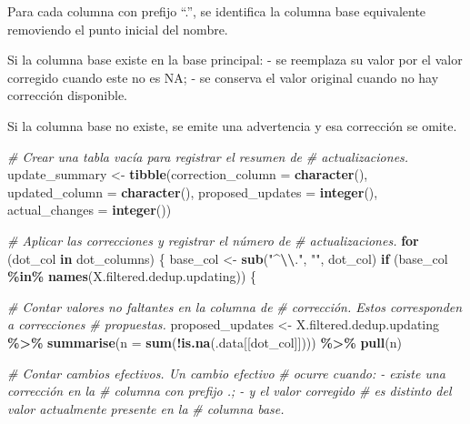 \documentclass[sn-apa,pdflatex]{sn-jnl}
\newenvironment{Shaded}{\begin{snugshade}}{\end{snugshade}}
\newcommand{\AttributeTok}[1]{\textcolor[rgb]{0.13,0.29,0.53}{#1}}
\newcommand{\CommentTok}[1]{\textcolor[rgb]{0.56,0.35,0.01}{\textit{#1}}}
\newcommand{\ControlFlowTok}[1]{\textcolor[rgb]{0.13,0.29,0.53}{\textbf{#1}}}
\newcommand{\FunctionTok}[1]{\textcolor[rgb]{0.13,0.29,0.53}{\textbf{#1}}}
\newcommand{\NormalTok}[1]{#1}
\newcommand{\OtherTok}[1]{\textcolor[rgb]{0.56,0.35,0.01}{#1}}
\newcommand{\SpecialCharTok}[1]{\textcolor[rgb]{0.81,0.36,0.00}{\textbf{#1}}}
\newcommand{\StringTok}[1]{\textcolor[rgb]{0.31,0.60,0.02}{#1}}
\begin{document}
Para cada columna con prefijo ``.'', se identifica la columna base
equivalente removiendo el punto inicial del nombre.

Si la columna base existe en la base principal: - se reemplaza su valor
por el valor corregido cuando este no es NA; - se conserva el valor
original cuando no hay corrección disponible.

Si la columna base no existe, se emite una advertencia y esa corrección
se omite.

\begin{Shaded}
\begin{Highlighting}[]
\CommentTok{\# Crear una tabla vacía para registrar el resumen de}
\CommentTok{\# actualizaciones.}
\NormalTok{update\_summary }\OtherTok{\textless{}{-}} \FunctionTok{tibble}\NormalTok{(}\AttributeTok{correction\_column =} \FunctionTok{character}\NormalTok{(), }\AttributeTok{updated\_column =} \FunctionTok{character}\NormalTok{(),}
    \AttributeTok{proposed\_updates =} \FunctionTok{integer}\NormalTok{(), }\AttributeTok{actual\_changes =} \FunctionTok{integer}\NormalTok{())}

\CommentTok{\# Aplicar las correcciones y registrar el número de}
\CommentTok{\# actualizaciones.}
\ControlFlowTok{for}\NormalTok{ (dot\_col }\ControlFlowTok{in}\NormalTok{ dot\_columns) \{}
\NormalTok{    base\_col }\OtherTok{\textless{}{-}} \FunctionTok{sub}\NormalTok{(}\StringTok{"\^{}}\SpecialCharTok{\textbackslash{}\textbackslash{}}\StringTok{."}\NormalTok{, }\StringTok{""}\NormalTok{, dot\_col)}
    \ControlFlowTok{if}\NormalTok{ (base\_col }\SpecialCharTok{\%in\%} \FunctionTok{names}\NormalTok{(X.filtered.dedup.updating)) \{}

        \CommentTok{\# Contar valores no faltantes en la columna de}
        \CommentTok{\# corrección.  Estos corresponden a correcciones}
        \CommentTok{\# propuestas.}
\NormalTok{        proposed\_updates }\OtherTok{\textless{}{-}}\NormalTok{ X.filtered.dedup.updating }\SpecialCharTok{\%\textgreater{}\%}
            \FunctionTok{summarise}\NormalTok{(}\AttributeTok{n =} \FunctionTok{sum}\NormalTok{(}\SpecialCharTok{!}\FunctionTok{is.na}\NormalTok{(.data[[dot\_col]]))) }\SpecialCharTok{\%\textgreater{}\%}
            \FunctionTok{pull}\NormalTok{(n)}

        \CommentTok{\# Contar cambios efectivos.  Un cambio efectivo}
        \CommentTok{\# ocurre cuando: {-} existe una corrección en la}
        \CommentTok{\# columna con prefijo \textquotesingle{}.\textquotesingle{}; {-} y el valor corregido}
        \CommentTok{\# es distinto del valor actualmente presente en la}
        \CommentTok{\# columna base.}


\end{Highlighting}
\end{Shaded}
\end{document}
